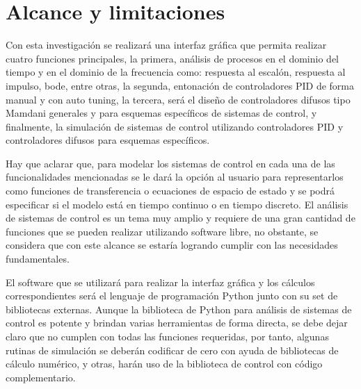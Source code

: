 \section{Alcance y limitaciones}

	Con esta investigación se realizará una interfaz gráfica que permita realizar cuatro funciones principales, la primera, análisis de procesos en el dominio del tiempo y en el dominio de la frecuencia como: respuesta al escalón, respuesta al impulso, bode, entre otras, la segunda, entonación de controladores PID de forma manual y con auto tuning, la tercera, será el diseño de controladores difusos tipo Mamdani generales y para esquemas específicos de sistemas de control, y finalmente, la simulación de sistemas de control utilizando controladores PID y controladores difusos para esquemas específicos.

	Hay que aclarar que, para modelar los sistemas de control en cada una de las funcionalidades mencionadas se le dará la opción al usuario para representarlos como funciones de transferencia o ecuaciones de espacio de estado y se podrá especificar si el modelo está en tiempo continuo o en tiempo discreto. El análisis de sistemas de control es un tema muy amplio y requiere de una gran cantidad de funciones que se pueden realizar utilizando software libre, no obstante, se considera que con este alcance se estaría logrando cumplir con las necesidades fundamentales. 

	El software que se utilizará para realizar la interfaz gráfica y los cálculos correspondientes será el lenguaje de programación Python junto con su set de bibliotecas externas. Aunque la biblioteca de Python para análisis de sistemas de control es potente y brindan varias herramientas de forma directa, se debe dejar claro que no cumplen con todas las funciones requeridas, por tanto, algunas rutinas de simulación se deberán codificar de cero con ayuda de bibliotecas de cálculo numérico, y otras, harán uso de la biblioteca de control con código complementario.

	
	